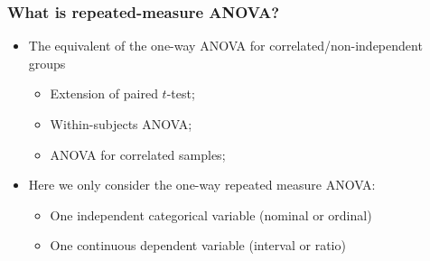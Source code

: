 \documentclass[table,10pt]{beamer}\usepackage[]{graphicx}\usepackage[]{color}
\begin{document}
\begin{CJK*}{UTF8}{gbsn}
\begin{frame}[t]
\frametitle{What is repeated-measure ANOVA?}
\begin{itemize}
	\item<1-> The equivalent of the one-way ANOVA for correlated/non-independent groups
	\begin{itemize}
		\item Extension of paired $t$-test;
		\item Within-subjects ANOVA;
		\item ANOVA for correlated samples;
	\end{itemize}
	\item<2-> Here we only consider the one-way repeated measure ANOVA:
	\begin{itemize}
		\item One independent categorical variable (nominal or ordinal)
		\item One continuous dependent variable (interval or ratio)
	\end{itemize}
\end{itemize}
\end{frame}



\end{CJK*}
\end{document}
